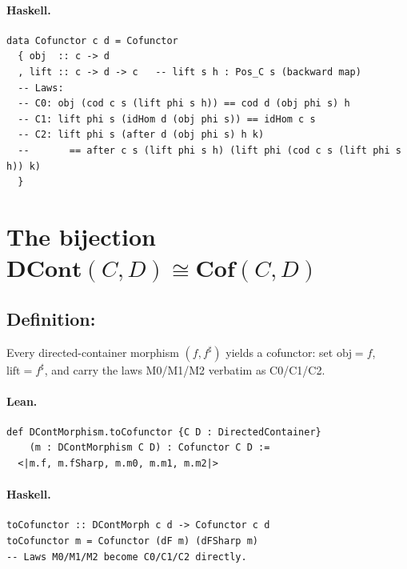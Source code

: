 \documentclass[11pt,a4paper]{article}
\begin{document}
\paragraph{Haskell.}
\begin{lstlisting}[style=haskell]
data Cofunctor c d = Cofunctor
  { obj  :: c -> d
  , lift :: c -> d -> c   -- lift s h : Pos_C s (backward map)
  -- Laws:
  -- C0: obj (cod c s (lift phi s h)) == cod d (obj phi s) h
  -- C1: lift phi s (idHom d (obj phi s)) == idHom c s
  -- C2: lift phi s (after d (obj phi s) h k)
  --       == after c s (lift phi s h) (lift phi (cod c s (lift phi s h)) k)
  }
\end{lstlisting}


\section{The bijection $\mathbf{DCont}(C,D) \cong \mathbf{Cof}(C,D)$}

\subsection{Definition: }

\begin{defn}
Every directed-container morphism $(f, f^\sharp)$ yields a cofunctor: set
$\mathrm{obj} = f$, $\mathrm{lift} = f^\sharp$, and carry the laws
M0/M1/M2 verbatim as C0/C1/C2.
\end{defn}

\paragraph{Lean.}
\begin{lstlisting}[style=lean]
def DContMorphism.toCofunctor {C D : DirectedContainer}
    (m : DContMorphism C D) : Cofunctor C D :=
  <|m.f, m.fSharp, m.m0, m.m1, m.m2|>
\end{lstlisting}

\paragraph{Haskell.}
\begin{lstlisting}[style=haskell]
toCofunctor :: DContMorph c d -> Cofunctor c d
toCofunctor m = Cofunctor (dF m) (dFSharp m)
-- Laws M0/M1/M2 become C0/C1/C2 directly.
\end{lstlisting}
\end{document}
